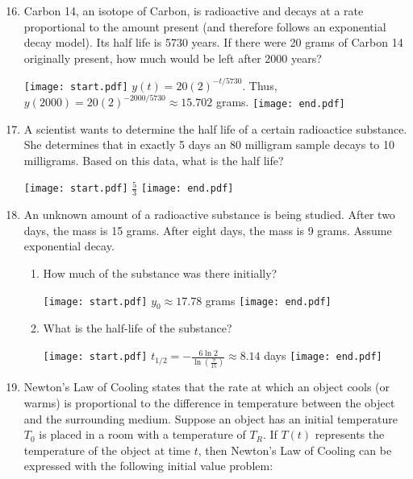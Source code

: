 \documentclass[12pt]{article}
\begin{document}
\begin{enumerate}
\setcounter{enumi}{15}

\item Carbon 14, an isotope of Carbon, is radioactive and decays at a rate proportional to the amount present (and therefore follows an exponential decay model).  Its half life is 5730 years.  If there were 20 grams of Carbon 14 originally present, how much would be left after 2000 years?

\texttt{[image: start.pdf]}
{{$y(t)=20(2)^{-t/5730}$.  Thus, $y(2000)=20(2)^{-2000/5730}\approx 15.702$ grams.}}
\texttt{[image: end.pdf]}


\item A scientist wants to determine the half life of a certain radioactice substance.  She determines that in exactly 5 days an 80 milligram sample decays to 10 milligrams.  Based on this data, what is the half life?

\texttt{[image: start.pdf]}
{{$\frac{5}{3}$}}
\texttt{[image: end.pdf]}


\item An unknown amount of a radioactive substance is being studied.  After two days, the mass is 15 grams.  After eight days, the mass is 9 grams.  Assume exponential decay.

\begin{enumerate}

\item How much of the substance was there initially?

\texttt{[image: start.pdf]}
{{$y_0\approx 17.78$ grams}}
\texttt{[image: end.pdf]}


\item What is the half-life of the substance?

\texttt{[image: start.pdf]}
{{$t_{1/2}=-\frac{6\ln{2}}{\ln{\left(\frac{9}{15}\right)}}\approx 8.14$ days}}
\texttt{[image: end.pdf]}


\end{enumerate}

\item Newton's Law of Cooling states that the rate at which an object cools (or warms) is proportional to the difference in temperature between the object and the surrounding medium.  Suppose an object has an initial temperature $T_0$ is placed in a room with a temperature of $T_R$.  If $T(t)$ represents the temperature of the object at time $t$, then Newton's Law of Cooling can be expressed with the following initial value problem:


\end{enumerate}
\end{document}
